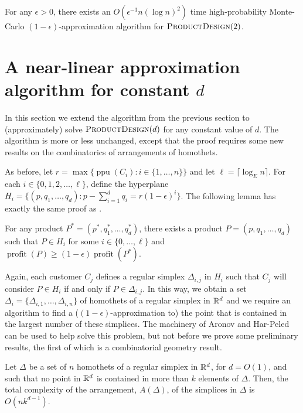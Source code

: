 \documentclass{llncs}
\newcommand{\ppu}{\operatorname{ppu}}
\newcommand{\val}{\operatorname{profit}}
\newcommand{\eps}{\epsilon}
\begin{document}
\begin{thm}
  For any $\eps >0$, there exists an $O(\eps^{-3}n(\log n)^2)$ time
  high-probability Monte-Carlo $(1-\eps)$-approximation algorithm for
  $\textsc{ProductDesign}(2)$.
\end{thm}

\section{A near-linear approximation algorithm for constant $d$}

In this section we extend the algorithm from the previous section to
(approximately) solve $\textsc{ProductDesign}(d)$ for any constant value of
$d$.  The algorithm is more or less unchanged, except that the proof
requires some new results on the combinatorics of arrangements of
homothets.

As before, let $r=\max\{\ppu(C_i) : i\in\{1,\ldots, n\}\}$ and let
$\ell = \lceil\log_E n\rceil$. For each $i\in\{0,1,2,\ldots,\ell\}$,
define the hyperplane $H_i = \{ (p,q_1,\ldots,q_d) : p-\sum_{i=1}^d
q_i =  r(1-\eps)^i \}$.  The following lemma has exactly the same proof
as .

\begin{lem}
  For any product $P^*=(p^*,q_1^*,\ldots,q_d^*)$, there exists
  a product $P=(p,q_1,\ldots,q_d)$ such that $P\in H_i$ for some
  $i\in\{0,\ldots,\ell\}$ and $\val(P) \ge (1-\eps)\val(P^*)$.
\end{lem}

Again, each customer $C_j$ defines a regular simplex $\Delta_{i,j}$
in $H_{i}$ such that $C_j$ will consider $P\in H_i$ if and
only if $P\in\Delta_{i,j}$.  In this way, we obtain a set
$\Delta_i=\{\Delta_{i,1},\ldots,\Delta_{i,n}\}$ of homothets of
a regular simplex in $\mathbb{R}^d$ and we require an algorithm to find a
($(1-\eps)$-approximation to) the point that is contained in the largest
number of these simplices.  The machinery of Aronov and Har-Peled
\cite{ah08} can be used to help solve this problem, but not before we
prove some preliminary results, the first of which is a combinatorial
geometry result.

\begin{lem}
  Let $\Delta$ be a set of $n$ homothets of a regular simplex in $\mathbb{R}^d$,
  for $d=O(1)$, and such that no point in $\mathbb{R}^d$ is contained in more
  than $k$ elements of $\Delta$.  Then, the total complexity of the
  arrangement, $A(\Delta)$, of the simplices in $\Delta$ is $O(nk^{d-1})$.
\end{lem}
\end{document}
